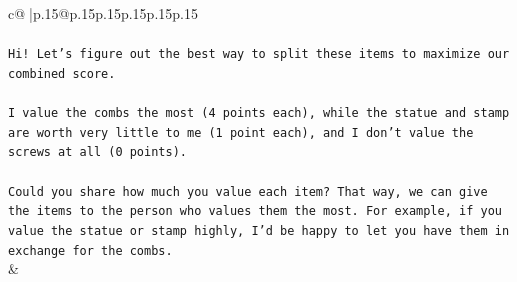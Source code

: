 \documentclass{article}
\begin{document}
{\begin{supertabular}{c@{$\;$}|p{.15\linewidth}@{}p{.15\linewidth}p{.15\linewidth}p{.15\linewidth}p{.15\linewidth}p{.15\linewidth}}
{{{\\ 
\\ 
\texttt{Hi! Let's figure out the best way to split these items to maximize our combined score.} \\
\\ 
\texttt{I value the combs the most (4 points each), while the statue and stamp are worth very little to me (1 point each), and I don't value the screws at all (0 points).} \\
\\ 
\texttt{Could you share how much you value each item? That way, we can give the items to the person who values them the most. For example, if you value the statue or stamp highly, I'd be happy to let you have them in exchange for the combs.} \\
            }
        }
    }
    & \\ \\


\end{supertabular}}
\end{document}
